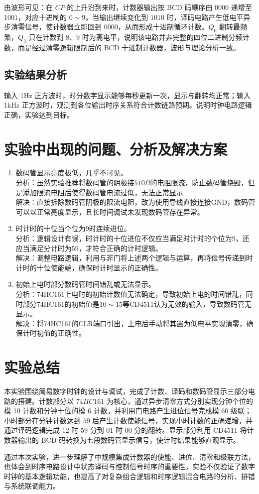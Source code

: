 \documentclass[a4paper,12pt]{article}
\begin{document}
由波形可见：在 $CP$ 的上升沿到来时，计数器输出按 BCD 码顺序由 $0000$ 递增至 $1001$，对应十进制的 $0\sim9$。当输出继续变化到 $1010$ 时，译码电路产生低电平异步清零信号，使计数器立即回到 $0000$，从而形成十进制循环计数。$Q_0$ 翻转最频繁，$Q_3$ 只在计数到 $8$、$9$ 时为高电平，说明该电路并非完整的四位二进制分频计数，而是经过清零逻辑限制后的 BCD 十进制计数器，波形与理论分析一致。

\subsection{实验结果分析}
输入 1Hz 正方波时，时分数字显示能够每秒更新一次，显示与翻转均正常；输入 1kHz 正方波时，观测到各位输出时序关系符合计数链路预期。说明时钟电路逻辑正确，实验达到目标。

\section{实验中出现的问题、分析及解决方案}
\begin{enumerate}
    \item 数码管显示亮度极低，几乎不可见。\\
    分析：虽然实验推荐将数码管的阴极接$510\Omega$的电阻限流，防止数码管烧毁，但是添加限流电阻后使得数码管电流过低，无法正常显示\\
    解决：直接拆除数码管阴极的限流电阻，改为使用导线直接连接GND，数码管可以以正常亮度显示，且长时间调试未发现数码管存在异常。

    \item 时计时的十位当个位为9时连续进位。\\
    分析：逻辑设计有误，时计时的十位进位不仅应当满足时计时的个位为9，还应当满足分计时为59，才符合正确的计时逻辑。\\
    解决：调整电路逻辑，利用与非门将上述两个逻辑与运算，再将信号传递到时计时的十位使能端，确保时计时显示的正确性。

    \item 初始上电时部分数码管时间错乱或无法显示。\\
    分析：74HC161上电时的初始计数值无法确定，导致初始上电的时间错乱，同时部分74HC161的初始值是$10\sim15$等CD4511认为无效的输入，导致数码管无显示。\\
    解决：将74HC161的CLR端口引出，上电后手动将其置为低电平实现清零，确保计时初值的正确性。
\end{enumerate}

\section{实验总结}
本实验围绕简易数字时钟的设计与调试，完成了计数、译码和数码管显示三部分电路的搭建。计数部分以 $74HC161$ 为核心，通过异步清零方式分别实现分钟个位的模 10 计数和分钟十位的模 6 计数，并利用门电路产生进位信号完成模 60 级联；小时部分在分钟计数达到 $59$ 后产生计数使能信号，实现小时计数的正确递增，并通过译码逻辑完成 $12$ 时 $59$ 分到 $01$ 时 $00$ 分的翻转。显示部分利用 CD4511 将计数器输出的 BCD 码转换为七段数码管显示信号，使计时结果能够直观显示。

通过本次实验，进一步理解了中规模集成计数器的使能、进位、清零和级联方法，也体会到时序电路设计中状态译码与控制信号时序的重要性。实验不仅验证了数字时钟的基本逻辑功能，也提高了对复杂组合逻辑和时序逻辑混合电路的分析、排错与系统联调能力。
\end{document}
